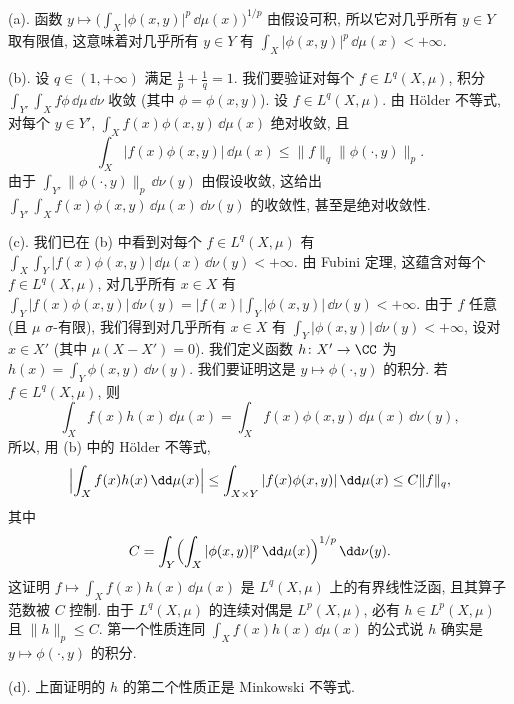 \begin{solution}
(a). 函数 $y \longmapsto \bigl(\int_X|\phi(x, y)|^p\,\dd\mu(x)\bigr)^{1/p}$ 由假设可积, 所以它对几乎所有 $y \in Y$ 取有限值, 这意味着对几乎所有 $y \in Y$ 有 $\int_X|\phi(x, y)|^p\,\dd\mu(x) < +\infty$.

(b). 设 $q \in (1, +\infty)$ 满足 $\frac{1}{p} + \frac{1}{q} = 1$. 我们要验证对每个 $f \in L^q(X, \mu)$, 积分 $\int_{Y'}\int_X f\phi\,\dd\mu\,\dd\nu$ 收敛 (其中 $\phi = \phi(x, y)$). 设 $f \in L^q(X, \mu)$. 由 H\"older 不等式, 对每个 $y \in Y'$, $\int_X f(x)\phi(x, y)\,\dd\mu(x)$ 绝对收敛, 且
\[
\int_X |f(x)\phi(x, y)|\,\dd\mu(x) \leq \|f\|_q\|\phi(\cdot, y)\|_p.
\]
由于 $\int_{Y'}\|\phi(\cdot, y)\|_p\,\dd\nu(y)$ 由假设收敛, 这给出 $\int_{Y'}\int_X f(x)\phi(x, y)\,\dd\mu(x)\,\dd\nu(y)$ 的收敛性, 甚至是绝对收敛性.

(c). 我们已在 (b) 中看到对每个 $f \in L^q(X, \mu)$ 有 $\int_X\int_Y |f(x)\phi(x, y)|\,\dd\mu(x)\,\dd\nu(y) < +\infty$. 由 Fubini 定理, 这蕴含对每个 $f \in L^q(X, \mu)$, 对几乎所有 $x \in X$ 有 $\int_Y |f(x)\phi(x, y)|\,\dd\nu(y) = |f(x)|\int_Y|\phi(x, y)|\,\dd\nu(y) < +\infty$. 由于 $f$ 任意 (且 $\mu$ $\sigma$-有限), 我们得到对几乎所有 $x \in X$ 有 $\int_Y|\phi(x, y)|\,\dd\nu(y) < +\infty$, 设对 $x \in X'$ (其中 $\mu(X - X') = 0$).
我们定义函数 $h \colon X' \to \CC$ 为 $h(x) = \int_Y\phi(x, y)\,\dd\nu(y)$. 我们要证明这是 $y \longmapsto \phi(\cdot, y)$ 的积分. 若 $f \in L^q(X, \mu)$, 则
\[
\int_X f(x)h(x)\,\dd\mu(x) = \int_X f(x)\phi(x, y)\,\dd\mu(x)\,\dd\nu(y),
\]
所以, 用 (b) 中的 H\"older 不等式,
\[
\Bigl|\int_X f(x)h(x)\,\dd\mu(x)\Bigr| \leq \int_{X \times Y}|f(x)\phi(x, y)|\,\dd\mu(x) \leq C\|f\|_q,
\]
其中
\[
C = \int_Y\Bigl(\int_X|\phi(x, y)|^p\,\dd\mu(x)\Bigr)^{1/p}\,\dd\nu(y).
\]
这证明 $f \longmapsto \int_X f(x)h(x)\,\dd\mu(x)$ 是 $L^q(X, \mu)$ 上的有界线性泛函, 且其算子范数被 $C$ 控制. 由于 $L^q(X, \mu)$ 的连续对偶是 $L^p(X, \mu)$, 必有 $h \in L^p(X, \mu)$ 且 $\|h\|_p \leq C$. 第一个性质连同 $\int_X f(x)h(x)\,\dd\mu(x)$ 的公式说 $h$ 确实是 $y \longmapsto \phi(\cdot, y)$ 的积分.

(d). 上面证明的 $h$ 的第二个性质正是 Minkowski 不等式.
\end{solution}
